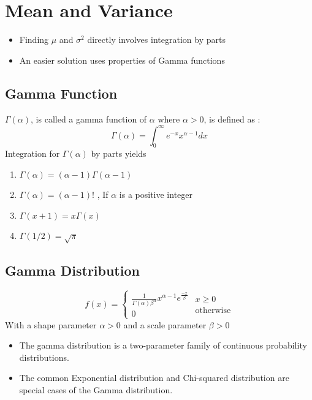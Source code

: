\documentclass{article}
\begin{document}
\section{Mean and Variance}
\begin{itemize}
\item Finding \(\mu\) and \(\sigma^2\) directly involves integration by parts
\item An easier solution uses properties of Gamma functions
\end{itemize}

\subsection{Gamma Function}
\(\Gamma(\alpha)\), is called a gamma function of \(\alpha\) where \(\alpha > 0\), is defined as : 
$$ \Gamma(\alpha) = \int_{0}^{\infty} e^{-x} x^{\alpha -1 } dx $$
Integration for \(\Gamma(\alpha)\) by parts yields 
\begin{enumerate}
\item \(\Gamma(\alpha) = (\alpha - 1) \Gamma ( \alpha - 1)\)
\item \(\Gamma(\alpha) = (\alpha - 1)! \) , If \(\alpha\) is a positive integer 
\item \(\Gamma(x+1) = x \Gamma(x) \)
\item \(\Gamma(1/2) = \sqrt{\pi}\)
\end{enumerate}

\subsection{Gamma Distribution}
$$ f(x) = \begin{cases} \frac{1}{\Gamma(\alpha) \beta^\alpha} x^{\alpha - 1} e^{\frac{-x}{\beta}} \\ 0 \end{cases} \begin{matrix}
x \geq 0 \\ \text{otherwise} 
\end{matrix}$$
With a shape parameter \(\alpha > 0 \) and a scale parameter \(\beta > 0\)

\begin{itemize}
\item The gamma distribution is a two-parameter family of continuous probability distributions.
\item The common Exponential distribution and Chi-squared distribution are special cases of the Gamma distribution.
\end{itemize}
\end{document}

